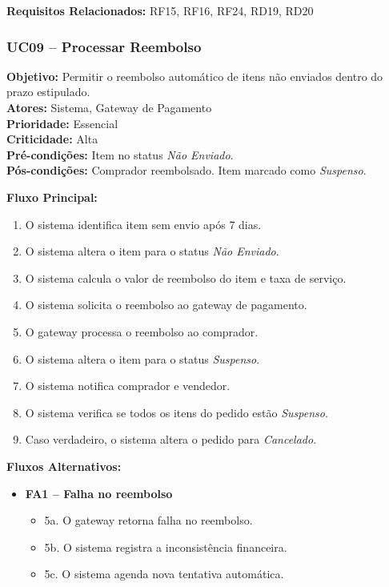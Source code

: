 \documentclass[
	article,			%
	11pt,				%
	oneside,			%
	a4paper,			%
	english,			%
	brazil,				%
	sumario=tradicional
	]{abntex2}
\begin{document}
\vspace{0.5em}
\noindent\textbf{Requisitos Relacionados:} RF15, RF16, RF24, RD19, RD20


\subsubsection{UC09 – Processar Reembolso}
\label{uc:07}
\noindent\textbf{Objetivo:} Permitir o reembolso automático de itens não enviados dentro do prazo estipulado.\\
\textbf{Atores:} Sistema, Gateway de Pagamento\\
\textbf{Prioridade:} Essencial\\
\textbf{Criticidade:} Alta\\
\textbf{Pré-condições:} Item no status \textit{Não Enviado}.\\
\textbf{Pós-condições:} Comprador reembolsado. Item marcado como \textit{Suspenso}.

\vspace{0.5em}
\noindent\textbf{Fluxo Principal:}
\begin{enumerate}[label=\arabic*.]
    \item O sistema identifica item sem envio após 7 dias.
    \item O sistema altera o item para o status \textit{Não Enviado}.
    \item O sistema calcula o valor de reembolso do item e taxa de serviço.
    \item O sistema solicita o reembolso ao gateway de pagamento.
    \item O gateway processa o reembolso ao comprador.
    \item O sistema altera o item para o status \textit{Suspenso}.
    \item O sistema notifica comprador e vendedor.
    \item O sistema verifica se todos os itens do pedido estão \textit{Suspenso}.
    \item Caso verdadeiro, o sistema altera o pedido para \textit{Cancelado}.
\end{enumerate}

\vspace{0.5em}
\noindent\textbf{Fluxos Alternativos:}
\begin{itemize}[leftmargin=*]
    \item \textbf{FA1 – Falha no reembolso}
    \begin{itemize}[label={}, leftmargin=0.5cm]
        \item 5a. O gateway retorna falha no reembolso.
        \item 5b. O sistema registra a inconsistência financeira.
        \item 5c. O sistema agenda nova tentativa automática.
    \end{itemize}
\end{itemize}
\end{document}
